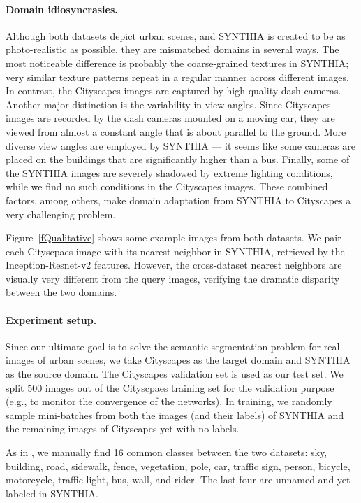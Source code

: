 \paragraph{Domain idiosyncrasies.}
Although both datasets depict urban scenes, and {SYNTHIA} is created to be as photo-realistic as possible, they are mismatched domains in several ways. The most noticeable difference is probably the coarse-grained textures in SYNTHIA; very similar texture patterns repeat in a regular manner across different images. In contrast, the Cityscapes images are captured by high-quality dash-cameras. Another major distinction is the variability in view angles. Since Cityscapes images are recorded by the dash cameras mounted on a moving car, they are viewed from almost a constant angle that is about parallel to the ground.  More diverse view angles are employed by SYNTHIA --- it seems like some cameras are placed on the buildings that are significantly higher than a bus. Finally, some of the SYNTHIA images are severely shadowed by extreme lighting conditions, while we find no such conditions in the Cityscapes images. These combined factors, among others, make domain adaptation from SYNTHIA to Cityscapes a very challenging problem. 

Figure~\ref{fQualitative} shows some example images from both datasets. We pair each Cityscpaes image with its nearest neighbor in SYNTHIA, retrieved by the Inception-Resnet-v2 \cite{szegedy_inception-v4_2016} features. However, the cross-dataset nearest neighbors are visually very different from the query images, verifying the dramatic disparity  between the two domains.
\vspace{-10pt}





\paragraph{Experiment setup.}
Since our ultimate goal is to solve the semantic segmentation problem for real images of urban scenes, we take Cityscapes as the target domain and SYNTHIA as the source domain. The Cityscapes validation set is used as our test set. We split 500 images out of the Cityscpaes training set for the validation purpose (e.g., to monitor the convergence of the networks). In training,  we randomly sample mini-batches from both the images (and their labels) of SYNTHIA and the remaining images of Cityscapes yet with no labels. 

As in \cite{hoffman_fcns_2016}, we manually find 16 common classes between the two datasets: sky, building, road, sidewalk, fence, vegetation, pole, car, traffic sign, person, bicycle, motorcycle, traffic light, bus, wall, and rider. The last four are unnamed and yet labeled in SYNTHIA. 
\vspace{-10pt}

